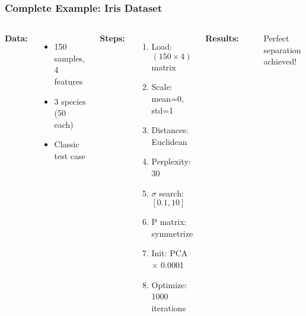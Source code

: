 \documentclass[aspectratio=169]{beamer}
\begin{document}
\begin{frame}
\frametitle{Complete Example: Iris Dataset}
\begin{columns}[T]
\textbf{Data:}
\begin{itemize}
\small
\item 150 samples, 4 features
\item 3 species (50 each)
\item Classic test case
\end{itemize}

\textbf{Steps:}
\begin{enumerate}
\footnotesize
\item Load: $(150 \times 4)$ matrix
\item Scale: mean=0, std=1
\item Distances: Euclidean
\item Perplexity: 30
\item $\sigma$ search: $[0.1, 10]$
\item P matrix: symmetrize
\item Init: PCA × 0.0001
\item Optimize: 1000 iterations
\end{enumerate}

\textbf{Results:}
\begin{center}
\end{center}

Perfect separation achieved!
\end{columns}
\end{frame}
\end{document}
